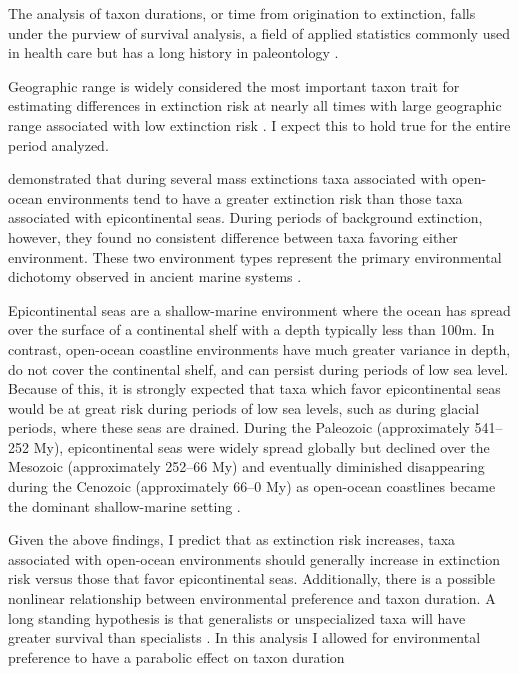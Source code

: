 \documentclass{article}
\begin{document}
The analysis of taxon durations, or time from origination to extinction, falls under the purview of survival analysis, a field of applied statistics commonly used in health care \citep{Klein2003} but has a long history in paleontology \citep{Simpson1944,Simpson1953,VanValen1973,VanValen1979}.

Geographic range is widely considered the most important taxon trait for estimating differences in extinction risk at nearly all times with large geographic range associated with low extinction risk \citep{Jablonski1986,Jablonski1987,Jablonski2003,Payne2007}. I expect this to hold true for the entire period analyzed.

\citet{Miller2009a} demonstrated that during several mass extinctions taxa associated with open-ocean environments tend to have a greater extinction risk than those taxa associated with epicontinental seas. During periods of background extinction, however, they found no consistent difference between taxa favoring either environment. These two environment types represent the primary environmental dichotomy observed in ancient marine systems \citep{Miller2009a,Peters2008,Sheehan2001b}. 

Epicontinental seas are a shallow-marine environment where the ocean has spread over the surface of a continental shelf with a depth typically less than 100m. In contrast, open-ocean coastline environments have much greater variance in depth, do not cover the continental shelf, and can persist during periods of low sea level. Because of this, it is strongly expected that taxa which favor epicontinental seas would be at great risk during periods of low sea levels, such as during glacial periods, where these seas are drained. During the Paleozoic (approximately 541--252 My), epicontinental seas were widely spread globally but declined over the Mesozoic (approximately 252--66 My) and eventually diminished disappearing during the Cenozoic (approximately 66--0 My) as open-ocean coastlines became the dominant shallow-marine setting \citep{Peters2008,Miller2009a,Johnson1974}. 

Given the above findings, I predict that as extinction risk increases, taxa associated with open-ocean environments should generally increase in extinction risk versus those that favor epicontinental seas. Additionally, there is a possible nonlinear relationship between environmental preference and taxon duration. A long standing hypothesis is that generalists or unspecialized taxa will have greater survival than specialists \citep{Simpson1944,Liow2004a,Liow2007b,Nurnberg2013a,Nurnberg2015,Baumiller1993}. In this analysis I allowed for environmental preference to have a parabolic effect on taxon duration 
\end{document}
